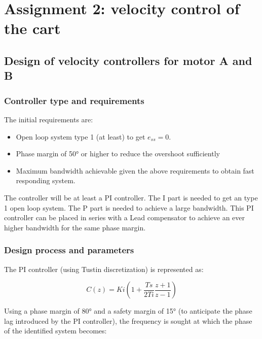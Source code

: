 \documentclass[a4paper]{article}
\newcommand{\newpar}{\vspace{.3cm}\noindent}
\begin{document}

\section{Assignment 2: velocity control of the cart}

\subsection{Design of velocity controllers for motor A and B}

\subsubsection{Controller type and requirements}

The initial requirements are:

\begin{itemize}
  \item Open loop system type 1 (at least) to get \(e_{ss} = 0\).
  \item Phase margin of 50° or higher to reduce the overshoot sufficiently
  \item Maximum bandwidth achievable given the above requirements to obtain fast responding system.
\end{itemize}

\newpar
The controller will be at least a PI controller. The I part is needed to get an type 1 open loop system. The P part is needed to achieve a large bandwidth. This PI controller can be placed in series with a Lead compensator to achieve an ever higher bandwidth for the same phase margin.

\subsubsection{Design process and parameters}

The PI controller (using Tustin discretization) is represented as:

\begin{equation}
    C(z) = Ki \left( 1 + \frac{Ts}{2Ti}\frac{z+1}{z-1}\right)
\end{equation}

\newpar
Using a phase margin of 80° and a safety margin of 15° (to anticipate the phase lag introduced by the PI controller), the frequency is sought at which the phase of the identified system becomes:
\end{document}
